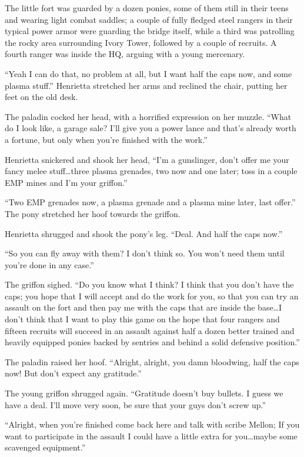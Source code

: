 The little fort was guarded by a dozen ponies, some of them still in their teens and wearing light combat saddles; a couple of fully fledged steel rangers in their typical power armor were guarding the bridge itself, while a third was patrolling the rocky area surrounding Ivory Tower, followed by a couple of recruits. A fourth ranger was inside the HQ, arguing with a young mercenary.

``Yeah I can do that, no problem at all, but I want half the caps now, and some plasma stuff.'' Henrietta stretched her arms and reclined the chair, putting her feet on the old desk.

The paladin cocked her head, with a horrified expression on her muzzle. ``What do I look like, a garage sale? I'll give you a power lance and that's already worth a fortune, but only when you're finished with the work.''

Henrietta snickered and shook her head, ``I'm a gunslinger, don't offer me your fancy melee stuff\dots three plasma grenades, two now and one later; toss in a couple EMP mines and I'm your griffon.''

``Two EMP grenades now, a plasma grenade and a plasma mine later, last offer.'' The pony stretched her hoof towards the griffon.

Henrietta shrugged and shook the pony's leg. ``Deal. And half the caps now.''

``So you can fly away with them? I don't think so. You won't need them until you're done in any case.''

The griffon sighed. ``Do you know what I think? I think that you don't have the caps; you hope that I will accept and do the work for you, so that you can try an assault on the fort and then pay me with the caps that are inside the base\dots I don't think that I want to play this game on the hope that four rangers and fifteen recruits will succeed in an assault against half a dozen better trained and heavily equipped ponies backed by sentries and behind a solid defensive position.''

The paladin raised her hoof. ``Alright, alright, you damn bloodwing, half the caps now! But don't expect any gratitude.''

The young griffon shrugged again. ``Gratitude doesn't buy bullets. I guess we have a deal. I'll move very soon, be sure that your guys don't screw up.''

``Alright, when you're finished come back here and talk with scribe Mellon; If you want to participate in the assault I could have a little extra for you\dots maybe some scavenged equipment.''

